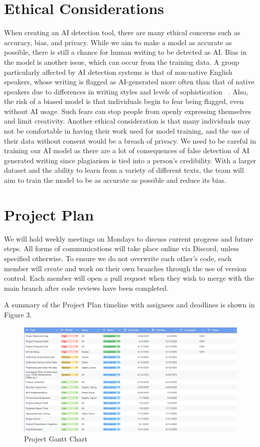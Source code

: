 \documentclass{article} %
\begin{document}
\section{Ethical Considerations}
When creating an AI detection tool, there are many ethical concerns such as accuracy, bias, and privacy.
While we aim to make a model as accurate as possible, there is still a chance for human writing to be detected as AI. Bias in the model is another issue, which can occur from the training data. A group particularly affected by AI detection systems is that of non-native English speakers, whose writing is flagged as AI-generated more often than that of native speakers due to differences in writing styles and levels of sophistication ~\citep{stanford}. Also, the risk of a biased model is that individuals begin to fear being flagged, even without AI usage. Such fears can stop people from openly expressing themselves and limit creativity. Another ethical consideration is that many individuals may not be comfortable in having their work used for model training, and the use of their data without consent would be a breach of privacy. 
We need to be careful in training our AI model as there are a lot of consequences of false detection of AI generated writing since plagiarism is tied into a person’s credibility. With a larger dataset and the ability to learn from a variety of different texts, the team will aim to train the model to be as accurate as possible and reduce its bias.

\section{Project Plan}
We will hold weekly meetings on Mondays to discuss current progress and future steps. All forms of communications will take place online via Discord, unless specified otherwise. To ensure we do not overwrite each other's code, each member will create and work on their own branches through the use of version control. Each member will open a pull request when they wish to merge with the main branch after code reviews have been completed. 

A summary of the Project Plan timeline with assignees and deadlines is shown in Figure 3. 
\begin{figure}[htbp]
    \centering
    \includegraphics[width=0.9\linewidth,height=0.9\textheight,keepaspectratio]{gnatt.png}
    \caption{Project Gantt Chart}
    \label{fig:pipeline}
\end{figure}
\end{document}
